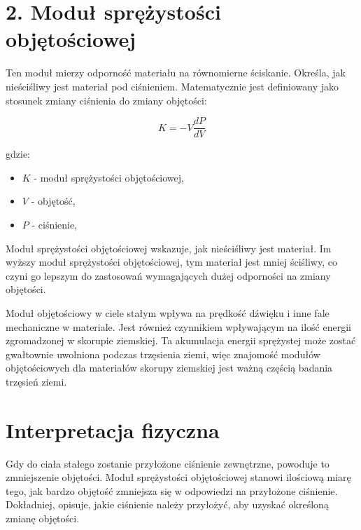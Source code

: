 {}
\justify
\fontsize{14}{16}\selectfont
\setlength{\parindent}{0pt}
\section*{2. Moduł sprężystości objętościowej \cite{alma991000389799708832, hyperphysics_url}} 
\fontsize{12}{14}\selectfont

\hspace{1.5cm} Ten moduł mierzy odporność materiału na równomierne ściskanie. 
Określa, jak nieściśliwy jest materiał pod ciśnieniem. 
Matematycznie jest definiowany jako stosunek zmiany ciśnienia do zmiany objętości:

$$
K = -V \frac{dP}{dV}
$$

gdzie:
\begin{itemize}
    \item  $K$ - moduł sprężystości objętościowej,
    \item  $V$ - objętość,
    \item  $P$ - ciśnienie,
\end{itemize}

\hspace{1.5cm} Moduł sprężystości objętościowej wskazuje, jak nieściśliwy jest materiał. Im wyższy moduł sprężystości objętościowej, tym materiał jest mniej ściśliwy, co czyni go lepszym do zastosowań wymagających dużej odporności na zmiany objętości.

\hspace{1.5cm} Moduł objętościowy w ciele stałym wpływa na prędkość dźwięku i inne fale mechaniczne w materiale. Jest również czynnikiem wpływającym na ilość energii zgromadzonej w skorupie ziemskiej. Ta akumulacja energii sprężystej może zostać gwałtownie uwolniona podczas trzęsienia ziemi, więc znajomość modułów objętościowych dla materiałów skorupy ziemskiej jest ważną częścią badania trzęsień ziemi. 
{}
\section*{Interpretacja fizyczna \cite{alma991000386409708832}}
\vspace{-1.0em}
\label{sec:spacing_font_size}
\hspace{1.5cm} Gdy do ciała stałego zostanie przyłożone ciśnienie zewnętrzne, powoduje to zmniejszenie objętości. Moduł sprężystości objętościowej stanowi ilościową miarę tego, jak bardzo objętość zmniejsza się w odpowiedzi na przyłożone ciśnienie. Dokładniej, opisuje, jakie ciśnienie należy przyłożyć, aby uzyskać określoną zmianę objętości.

